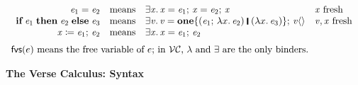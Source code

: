{\begin{figure}[t]
$$\begin{array}{l}
\begin{array}{rcll}
      \ensuremath{\Varid{e}_{\mathrm{1}}=\Varid{e}_{\mathrm{2}}}      & \text{means} & \ensuremath{\exists\Varid{x}.\,\Varid{x}=\Varid{e}_{\mathrm{1}};\,\Varid{x}=\Varid{e}_{\mathrm{2}};\,\Varid{x}}       & \ensuremath{\Varid{x}}\ \text{fresh} \\

      \ensuremath{\textbf{if}\;\Varid{e}_{\mathrm{1}}\;\textbf{then}\;\Varid{e}_{\mathrm{2}}\;\textbf{else}\;\Varid{e}_{\mathrm{3}}} & \text{means}
      & \ensuremath{\exists\Varid{v}.\,\Varid{v}=\textbf{one}\{(\Varid{e}_{\mathrm{1}};\,\lambda x.\,\Varid{e}_{\mathrm{2}})\;\rule[-0.3mm]{0.5mm}{2.5mm}\;(\lambda x.\,\Varid{e}_{\mathrm{3}})\};\,\Varid{v}\langle\rangle} & \text{\ensuremath{\Varid{v},\Varid{x}} fresh} \\
      \ensuremath{\Varid{x}\mathrel{\coloneqq}\Varid{e}_{\mathrm{1}};\,\Varid{e}_{\mathrm{2}}} & \text{means} & \ensuremath{\exists\Varid{x}.\,\Varid{x}=\Varid{e}_{\mathrm{1}};\,\Varid{e}_{\mathrm{2}}} \\
     \end{array} \\
  \\[-2mm]
  \text{$\freevars{e}$ means the free variable of $e$; in \versecalc{}, $\lambda$ and \ensuremath{\exists} are the only binders.}
  \end{array}
$$
\caption{\textbf{The Verse Calculus: Syntax}}
\label{fig:syntax}
\end{figure}
}


